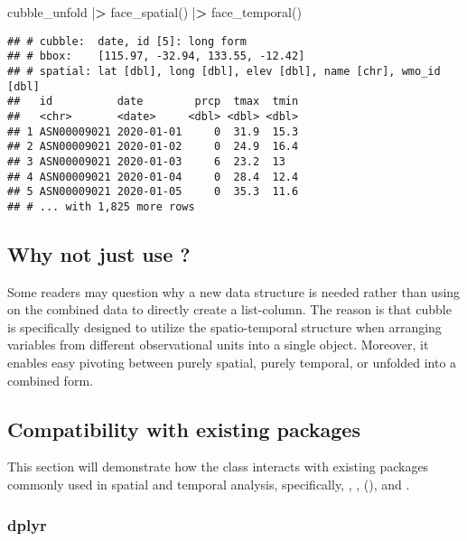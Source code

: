\documentclass{article}
\newenvironment{Shaded}{\begin{snugshade}}{\end{snugshade}}
\newcommand{\ErrorTok}[1]{\textcolor[rgb]{0.64,0.00,0.00}{\textbf{#1}}}
\newcommand{\FunctionTok}[1]{\textcolor[rgb]{0.00,0.00,0.00}{#1}}
\newcommand{\NormalTok}[1]{#1}
\newcommand{\SpecialCharTok}[1]{\textcolor[rgb]{0.00,0.00,0.00}{#1}}
\begin{document}
\begin{Shaded}
\begin{Highlighting}[]
\NormalTok{cubble\_unfold }\SpecialCharTok{|}\ErrorTok{\textgreater{}} \FunctionTok{face\_spatial}\NormalTok{() }\SpecialCharTok{|}\ErrorTok{\textgreater{}} \FunctionTok{face\_temporal}\NormalTok{()}
\end{Highlighting}
\end{Shaded}

\begin{verbatim}
## # cubble:  date, id [5]: long form
## # bbox:    [115.97, -32.94, 133.55, -12.42]
## # spatial: lat [dbl], long [dbl], elev [dbl], name [chr], wmo_id [dbl]
##   id          date        prcp  tmax  tmin
##   <chr>       <date>     <dbl> <dbl> <dbl>
## 1 ASN00009021 2020-01-01     0  31.9  15.3
## 2 ASN00009021 2020-01-02     0  24.9  16.4
## 3 ASN00009021 2020-01-03     6  23.2  13  
## 4 ASN00009021 2020-01-04     0  28.4  12.4
## 5 ASN00009021 2020-01-05     0  35.3  11.6
## # ... with 1,825 more rows
\end{verbatim}

\subsection[Why not just use]{Why not just use ?}

Some readers may question why a new data structure is needed rather than using  on the combined data to directly create a list-column. The reason is that cubble is specifically designed to utilize the spatio-temporal structure when arranging variables from different observational units into a single object. Moreover, it enables easy pivoting between purely spatial, purely temporal, or unfolded into a combined form.

\hypertarget{compact}{%
\subsection{Compatibility with existing packages}\label{compact}}

This section will demonstrate how the  class interacts with existing packages commonly used in spatial and temporal analysis, specifically, , ,  (), and .

\hypertarget{dplyr}{%
\subsubsection{dplyr}\label{dplyr}}
\end{document}
